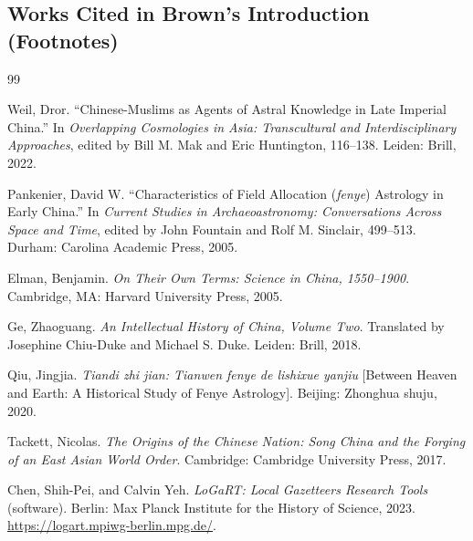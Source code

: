 \documentclass[10pt]{article}
\begin{document}
\subsection*{Works Cited in Brown's Introduction (Footnotes)}

\renewcommand{\refname}{}
\begin{thebibliography}{99}
\setlength{\itemsep}{0.6em}

 Weil, Dror. ``Chinese-Muslims as Agents of Astral Knowledge in Late Imperial China.'' In \emph{Overlapping Cosmologies in Asia: Transcultural and Interdisciplinary Approaches}, edited by Bill M. Mak and Eric Huntington, 116--138. Leiden: Brill, 2022.

 Pankenier, David W. ``Characteristics of Field Allocation (\emph{fenye}) Astrology in Early China.'' In \emph{Current Studies in Archaeoastronomy: Conversations Across Space and Time}, edited by John Fountain and Rolf M. Sinclair, 499--513. Durham: Carolina Academic Press, 2005.

 Elman, Benjamin. \emph{On Their Own Terms: Science in China, 1550--1900}. Cambridge, MA: Harvard University Press, 2005.

 Ge, Zhaoguang. \emph{An Intellectual History of China, Volume Two}. Translated by Josephine Chiu-Duke and Michael S. Duke. Leiden: Brill, 2018.

 Qiu, Jingjia. \emph{Tiandi zhi jian: Tianwen fenye de lishixue yanjiu} [Between Heaven and Earth: A Historical Study of Fenye Astrology]. Beijing: Zhonghua shuju, 2020.

 Tackett, Nicolas. \emph{The Origins of the Chinese Nation: Song China and the Forging of an East Asian World Order}. Cambridge: Cambridge University Press, 2017.

 Chen, Shih-Pei, and Calvin Yeh. \emph{LoGaRT: Local Gazetteers Research Tools} (software). Berlin: Max Planck Institute for the History of Science, 2023. \url{https://logart.mpiwg-berlin.mpg.de/}.

\end{thebibliography}
\end{document}
